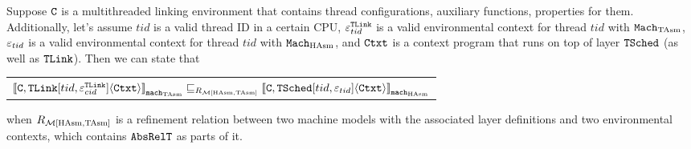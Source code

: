 \begin{lemma}
\label{lemma:chapter:conlink:tasm-refines-hasm}
Suppose  ${{\mathrm{\texttt{C}}}}$ is a multithreaded linking environment that contains thread configurations, auxiliary functions, properties for them. 
Additionally, let's assume  
$tid$ is a valid thread ID in a certain CPU,
  ${\varepsilon}^{{{\mathrm{\texttt{TLink}}}}}_{tid}$ is a valid
environmental context for  thread $tid$ with ${\mathrm{\texttt{Mach}}}_{\mathrm{TAsm}}$,
 ${\varepsilon}_{tid}$ is a valid
environmental context for thread $tid$ with ${\mathrm{\texttt{Mach}}}_{\mathrm{HAsm}}$,
and ${\mathrm{\texttt{Ctxt}}}$ is a
context program that runs on top of layer ${{\mathrm{\texttt{TSched}}}}$ (as well as ${{\mathrm{\texttt{TLink}}}}$).
 Then we can state that
 \begin{center}
\begin{tabular}{c}
${[\![{{{\mathrm{\texttt{C}}}}, {{\mathrm{\texttt{TLink}}}}[tid, {\varepsilon}^{{{\mathrm{\texttt{TLink}}}}}_{cid}]} \langle {{\mathrm{\texttt{Ctxt}}}} \rangle]\!]}_{{\mathrm{\texttt{mach}}}_{\mathrm{TAsm}}} \sqsubseteq_{R_{\mathcal{M}{[\mathrm{HAsm}, \mathrm{TAsm}]}}} {[\![{{{\mathrm{\texttt{C}}}}, {{\mathrm{\texttt{TSched}}}}[tid, {\varepsilon}_{tid}]} \langle {{\mathrm{\texttt{Ctxt}}}} \rangle]\!]}_{{{\mathrm{\texttt{mach}}}_{\mathrm{HAsm}}}}$\\
\end{tabular}
\end{center}
when $R_{\mathcal{M}{[\mathrm{HAsm}, \mathrm{TAsm}]}}$ is a refinement relation between two machine models with the associated layer definitions and
 two environmental contexts,
which contains ${{\mathrm{\texttt{AbsRelT}}}}$ as parts of it.
\end{lemma}

